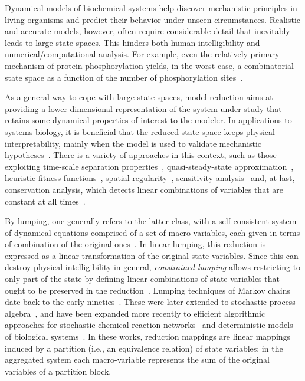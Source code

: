 Dynamical models of biochemical systems help discover mechanistic principles in living organisms and predict their behavior under unseen circumstances.
Realistic and accurate models, however, often require considerable detail that inevitably leads to large state spaces.
This hinders both human intelligibility and numerical/computational analysis.
For example, even the relatively primary mechanism of protein phosphorylation yields, in the worst case, a combinatorial state space as a function of the number of phosphorylation sites~\cite{FEBS:FEBS7027}.

As a general way to cope with large state spaces, model reduction aims at providing a lower-dimensional representation of the system under study that retains some dynamical properties of interest to the modeler.
In applications to systems biology, it is beneficial that the reduced state space keeps physical interpretability, mainly when the model is used to validate mechanistic hypotheses~\cite{10.1093/bioinformatics/btn035,21899762,Apri201216}.
There is a variety of approaches in this context, such as those exploiting time-scale separation properties~\cite{okino1998,DBLP:journals/tac/WhitbyCKLTT22}, quasi-steady-state approximation~\cite{SegelS89,radulescu2012reduction}, heuristic fitness functions~\cite{10.1145/3071178.3071265}, spatial regularity~\cite{DBLP:journals/pe/TschaikowskiT17}, sensitivity analysis~\cite{Snowden:2017aa} and, at last, conservation analysis, which detects linear combinations of variables that are constant at all times~\cite{10.1093/bioinformatics/bti800}.

By lumping, one generally refers to the latter class, with a self-consistent system of dynamical equations comprised of a set of macro-variables, each given in terms of combination of the original ones~\cite{okino1998,Snowden:2017aa,DBLP:conf/qest/GrossmannKBW18,backenkohler2021abstraction,DBLP:journals/pe/AbateACK21}.
In linear lumping, this reduction is expressed as a linear transformation of the original state variables.
Since this can destroy physical intelligibility in general, \emph{constrained lumping} allows restricting to only part of the state by defining linear combinations of state variables that ought to be preserved in the reduction~\cite{LI199195}.
Lumping techniques of Markov chains date back to the early nineties~\cite{Larsen19911}.
These were later extended to stochastic process algebra~\cite{10.1007/978-0-387-09680-3_18,10.1007/978-3-540-88479-8_13,10.1093/comjnl/bxr094,DBLP:conf/splc/Tribastone14,TSCHAIKOWSKI2014140}, and have been expanded more recently to efficient algorithmic approaches for stochastic chemical reaction networks~\cite{DBLP:journals/bioinformatics/CardelliPTTVW21} and deterministic models of biological systems~\cite{CARDELLI2019132,pnas17,DBLP:conf/lics/CardelliTTV16}.
In these works, reduction mappings are linear mappings induced by a partition (i.e., an equivalence relation) of state variables; in the aggregated system each macro-variable represents the sum of the original variables of a partition block.

